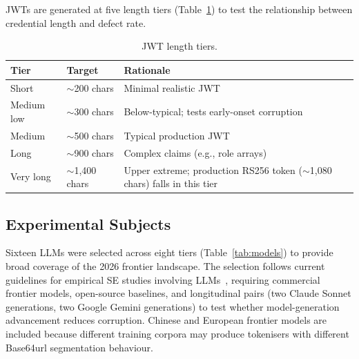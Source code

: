 JWTs are generated at five length tiers (Table~\ref{tab:jwt_tiers}) to test
the relationship between credential length and defect rate.

\begin{table}[t]
\centering
\small
\vspace{-4pt}\caption{JWT length tiers.}
\label{tab:jwt_tiers}
\begin{tabular}{@{}llp{3.8cm}@{}}
\toprule
\textbf{Tier} & \textbf{Target} & \textbf{Rationale} \\
\midrule
Short        & $\sim$200 chars & Minimal realistic JWT  \\
Medium low   & $\sim$300 chars & Below-typical; tests early-onset corruption \\
Medium       & $\sim$500 chars & Typical production JWT \\
Long         & $\sim$900 chars & Complex claims (e.g., role arrays) \\
Very long    & $\sim$1{,}400 chars & Upper extreme; production RS256 token ($\sim$1{,}080 chars) falls in this tier \\
\bottomrule
\end{tabular}
\end{table}

\subsection{Experimental Subjects}\label{sec:subjects}

Sixteen LLMs were selected across eight tiers (Table~\ref{tab:models}) to
provide broad coverage of the 2026 frontier landscape. The selection follows
current guidelines for empirical SE studies involving
LLMs~\cite{verdecchia2025notes}, requiring commercial frontier models,
open-source baselines, and longitudinal pairs (two Claude Sonnet generations,
two Google Gemini generations) to test whether model-generation advancement
reduces corruption. Chinese and European frontier models are included because
different training corpora may produce tokenisers with different Base64url
segmentation behaviour.

